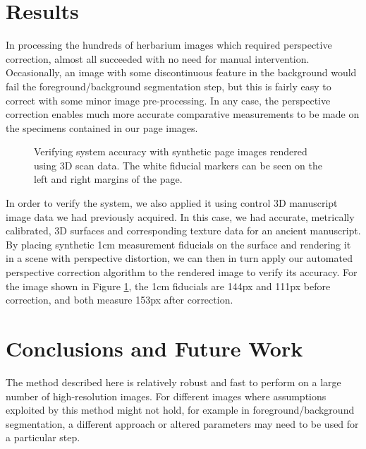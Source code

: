 \documentclass[a4paper]{llncs}
\begin{document}
\section{Results}

In processing the hundreds of herbarium images which required perspective correction, almost all succeeded
with no need for manual intervention. Occasionally, an image with some discontinuous feature in the background
would fail the foreground/background segmentation step, but this is fairly easy to correct with some minor
image pre-processing. In any case, the perspective correction enables much more accurate comparative measurements
to be made on the specimens contained in our page images.

\begin{figure}[h!tbm]
  \centering

  
  \caption{Verifying system accuracy with synthetic page images rendered using 3D scan data. The white fiducial markers can be seen on the left and right margins of the page.}\label{fig:synthetic}
\end{figure}

In order to verify the system, we also applied it using control 3D manuscript image data we had previously acquired.
In this case, we had accurate, metrically calibrated, 3D surfaces and corresponding texture data for an ancient manuscript. By placing synthetic 1cm measurement fiducials on the surface and rendering it in a scene with perspective distortion,
we can then in turn apply our automated perspective correction algorithm to the rendered image to verify its accuracy. For the image shown in Figure \ref{fig:synthetic}, the 1cm fiducials are 144px and 111px before correction, and both measure 153px after correction.

\section{Conclusions and Future Work}

The method described here is relatively robust and fast to perform on a large number of high-resolution images.
For different images where assumptions exploited by this method might not hold, for example in 
foreground/background segmentation, a different approach or altered parameters
may need to be used for a particular step.
\end{document}

